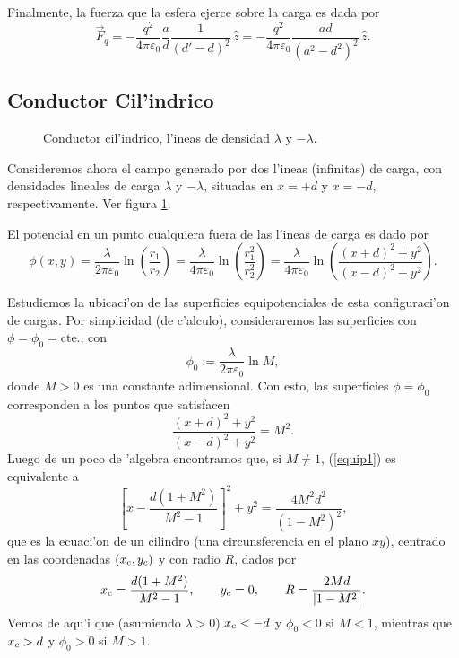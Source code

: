 Finalmente, la fuerza que la esfera ejerce sobre la carga es dada por
\begin{equation}
\vec{F}_q=-\frac{q^2}{4\pi\varepsilon_0}\frac{a}{d}\frac{1}{(d'-d)^2}\,
\hat{z}=-\frac { q^2 }{4\pi\varepsilon_0}\frac{ad}{(a^2-d^2)^2}\,\hat{z}.
\end{equation}

\subsection{Conductor Cil'indrico}
\begin{figure}[!h]
\centerline{}
\caption{Conductor cil'indrico, l'ineas de densidad $\lambda$ y $-\lambda$.}
\label{ci03}
\end{figure}
Consideremos ahora el campo generado por dos l'ineas (infinitas) de carga, con
densidades lineales de carga $\lambda$ y $-\lambda$, situadas en $x=+d$ y
$x=-d$, respectivamente. Ver figura \ref{ci03}.

El potencial en un punto cualquiera fuera de las l'ineas de carga es dado por
\begin{equation}
 \phi(x,y)=\frac{\lambda}{2\pi\varepsilon_0}\ln\left(\frac{r_1}{r_2}
\right)=\frac{\lambda}{4\pi\varepsilon_0}\ln\left(\frac{r_1^2}{r_2^2}
\right)=\frac{\lambda}{4\pi\varepsilon_0}\ln\left(\frac{(x+d)^2+y^2}{
(x-d)^2+y^2}\right).
\end{equation}

Estudiemos la ubicaci'on de las superficies equipotenciales de esta
configuraci'on de cargas. Por simplicidad (de c'alculo), consideraremos las superficies con $\phi=\phi_0=\text{cte.}$, con
\begin{equation}
 \phi_0:=\frac{\lambda}{2\pi\varepsilon_0}\ln M, \label{phi0M}
\end{equation}
donde $M>0$ es una constante adimensional.  Con esto, las superficies $\phi=\phi_0$
corresponden a los puntos que satisfacen
\begin{equation}
 \frac{(x+d)^2+y^2}{(x-d)^2+y^2}=M^2. \label{equip1}
\end{equation}
Luego de un poco de 'algebra encontramos que, si $M\neq 1$, (\ref{equip1}) es
equivalente a
\begin{equation}
 \left[x-\frac{d(1+M^2)}{M^2-1}\right]^2+y^2=\frac{4M^2d^2}{(1-M^2)^2},
\end{equation}
que es la ecuaci'on de un cilindro (una circunsferencia en el plano $xy$),
centrado en las coordenadas $(x_{\rm c},y_c)$ y con radio $R$, dados por
\begin{equation}
 x_{\rm c}=\frac{d(1+M^2)}{M^2-1}, \qquad y_c=0, \qquad R=\frac{2Md}{|1-M^2|}.
\label{cilim}
\end{equation}
Vemos de aqu'i que (asumiendo $\lambda>0$) $x_{\rm c}<-d$ y $\phi_0<0$ si $M<1$,
mientras que $x_{\rm c}>d$ y $\phi_0>0$ si $M>1$.

